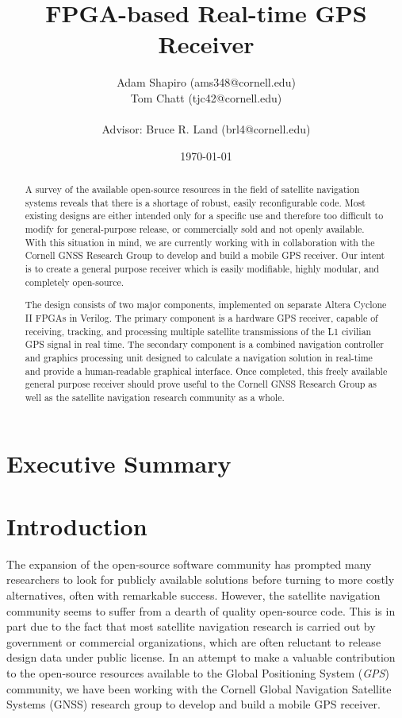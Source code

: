 \documentclass[12pt]{article}
\title{FPGA-based Real-time GPS Receiver}
\author{Adam Shapiro (ams348@cornell.edu) \\
              Tom Chatt (tjc42@cornell.edu) \\
              \\
              Advisor: Bruce R. Land (brl4@cornell.edu)}
\date{\today}
\begin{document}
\maketitle

\begin{abstract}
A survey of the available open-source resources in the field of satellite navigation 
systems reveals that there is a shortage of robust, easily reconfigurable code. Most existing 
designs are either intended only for a specific use and therefore too difficult to modify for general-purpose release, or commercially sold and not openly available. With this situation in mind, we are currently working with in collaboration with the Cornell GNSS Research Group to develop and build a mobile GPS receiver. Our intent is to create a general purpose receiver which is easily modifiable, highly modular, and completely open-source.

The design consists of two major components, implemented on separate Altera Cyclone II FPGAs in Verilog. The primary component is a hardware GPS receiver, capable of receiving, tracking, and processing multiple satellite transmissions of the L1 civilian GPS signal in real time. The secondary component is a combined navigation controller and graphics processing unit designed to calculate a navigation solution in real-time and provide a human-readable graphical interface. Once completed, this freely available general purpose receiver should prove useful to the Cornell GNSS Research Group as well as the satellite navigation research community as a whole.
\end{abstract}

\section*{Executive Summary}

\section{Introduction}
The expansion of the open-source software community has prompted many researchers to look for publicly available solutions before turning to more costly alternatives, often with remarkable success. However, the satellite navigation community seems to suffer from a dearth of quality open-source code. This is in part due to the fact that most satellite navigation research is carried out by government or commercial organizations, which are often reluctant to release design data under public license. In an attempt to make a valuable contribution to the open-source resources available to the Global Positioning System (\emph{GPS}) community, we have been working with the Cornell Global Navigation Satellite Systems (GNSS) research group to develop and build a mobile GPS receiver.
\end{document}
